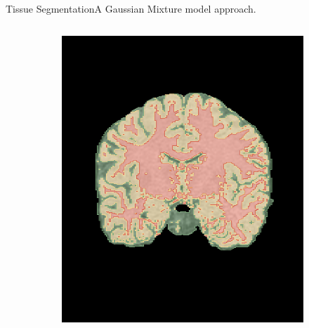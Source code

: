 \documentclass[]{standalone}
\begin{document}
\begin{frame}{Tissue Segmentation}{A Gaussian Mixture model approach.}
\begin{columns}
\begin{column}{0.7\textwidth}
\begin{figure}[h!]
\begin{subfigure}{0.45\textwidth}
					\includegraphics[scale=0.112]{./IMG/segmented_frontal.png}
				\end{subfigure}
				\hspace{15pt}
				\hspace{-48pt}
				\begin{subfigure}{0.45\textwidth}
					

\end{subfigure}
\end{figure}
\end{column}
\end{columns}
\end{frame}
\end{document}
